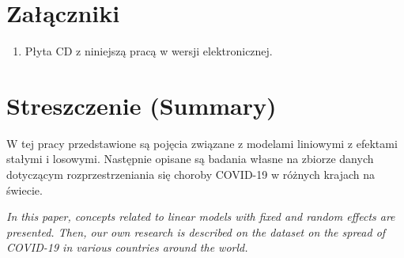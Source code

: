 \documentclass[12pt]{mwbk}
\theoremstyle{plain}
\theoremstyle{definition}
\theoremstyle{remark}
\begin{document}
\listoftables


\chapter*{Załączniki}
\begin{enumerate}
\item Płyta CD z niniejszą pracą w wersji elektronicznej.
\end{enumerate}




\chapter*{Streszczenie (Summary)}

\bigskip
\bigskip

\begin{center}
  \textbf{\tytul}
\end{center}

W tej pracy przedstawione są pojęcia związane z modelami liniowymi z efektami stałymi i losowymi. Następnie opisane są badania własne na zbiorze danych dotyczącym rozprzestrzeniania się choroby COVID-19 w różnych krajach na świecie.


\bigskip

\begin{center}
  \textbf{\textit{\tytulangielski}}
\end{center}



{\it
In this paper, concepts related to linear models with fixed and random effects are presented. Then, our own research is described on the dataset on the spread of COVID-19 in various countries around the world.
}
\end{document}
